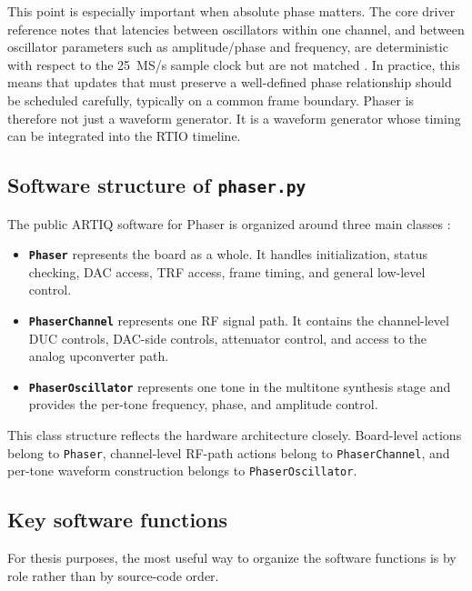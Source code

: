 This point is especially important when absolute phase matters. The core driver reference notes that latencies between oscillators within one channel, and between oscillator parameters such as amplitude/phase and frequency, are deterministic with respect to the 25~MS/s sample clock but are not matched \cite{artiq_coredrivers}. In practice, this means that updates that must preserve a well-defined phase relationship should be scheduled carefully, typically on a common frame boundary. Phaser is therefore not just a waveform generator. It is a waveform generator whose timing can be integrated into the RTIO timeline.

\subsection{Software structure of \texttt{phaser.py}}

The public ARTIQ software for Phaser is organized around three main classes \cite{artiq_phaser_module, artiq_coredrivers}:

\begin{itemize}
    \item \textbf{\texttt{Phaser}} represents the board as a whole. It handles initialization, status checking, DAC access, TRF access, frame timing, and general low-level control.
    \item \textbf{\texttt{PhaserChannel}} represents one RF signal path. It contains the channel-level DUC controls, DAC-side controls, attenuator control, and access to the analog upconverter path.
    \item \textbf{\texttt{PhaserOscillator}} represents one tone in the multitone synthesis stage and provides the per-tone frequency, phase, and amplitude control.
\end{itemize}

This class structure reflects the hardware architecture closely. Board-level actions belong to \texttt{Phaser}, channel-level RF-path actions belong to \texttt{PhaserChannel}, and per-tone waveform construction belongs to \texttt{PhaserOscillator}.

\subsection{Key software functions}

For thesis purposes, the most useful way to organize the software functions is by role rather than by source-code order.

